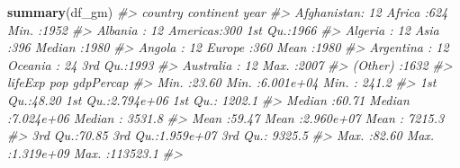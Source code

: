 \documentclass[
  xelatex, ja=standard]{bxjsbook}
\newenvironment{Shaded}{\begin{snugshade}}{\end{snugshade}}
\newcommand{\CommentTok}[1]{\textcolor[rgb]{0.56,0.35,0.01}{\textit{#1}}}
\newcommand{\FunctionTok}[1]{\textcolor[rgb]{0.13,0.29,0.53}{\textbf{#1}}}
\newcommand{\NormalTok}[1]{#1}
\theoremstyle{definition}
\theoremstyle{definition}
\theoremstyle{definition}
\theoremstyle{definition}
\theoremstyle{remark}
\begin{document}
\begin{Shaded}
\end{Shaded}

\begin{Shaded}
\begin{Highlighting}[]
\FunctionTok{summary}\NormalTok{(df\_gm)}
\CommentTok{\#\textgreater{}         country        continent        year     }
\CommentTok{\#\textgreater{}  Afghanistan:  12   Africa  :624   Min.   :1952  }
\CommentTok{\#\textgreater{}  Albania    :  12   Americas:300   1st Qu.:1966  }
\CommentTok{\#\textgreater{}  Algeria    :  12   Asia    :396   Median :1980  }
\CommentTok{\#\textgreater{}  Angola     :  12   Europe  :360   Mean   :1980  }
\CommentTok{\#\textgreater{}  Argentina  :  12   Oceania : 24   3rd Qu.:1993  }
\CommentTok{\#\textgreater{}  Australia  :  12                  Max.   :2007  }
\CommentTok{\#\textgreater{}  (Other)    :1632                                }
\CommentTok{\#\textgreater{}     lifeExp           pop              gdpPercap       }
\CommentTok{\#\textgreater{}  Min.   :23.60   Min.   :6.001e+04   Min.   :   241.2  }
\CommentTok{\#\textgreater{}  1st Qu.:48.20   1st Qu.:2.794e+06   1st Qu.:  1202.1  }
\CommentTok{\#\textgreater{}  Median :60.71   Median :7.024e+06   Median :  3531.8  }
\CommentTok{\#\textgreater{}  Mean   :59.47   Mean   :2.960e+07   Mean   :  7215.3  }
\CommentTok{\#\textgreater{}  3rd Qu.:70.85   3rd Qu.:1.959e+07   3rd Qu.:  9325.5  }
\CommentTok{\#\textgreater{}  Max.   :82.60   Max.   :1.319e+09   Max.   :113523.1  }
\CommentTok{\#\textgreater{} }
\end{Highlighting}
\end{Shaded}
\end{document}

